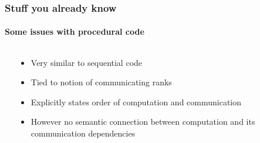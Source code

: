 \begin{frame}[fragile]
\frametitle{Stuff you already know}
\framesubtitle{Some issues with procedural code}

  \begin{columns}
    \begin{column}{0.4\textwidth}
      
    \end{column}
    \begin{column}{0.6\textwidth}
      \begin{itemize}
      \item Very similar to sequential code
      \item Tied to notion of communicating ranks
      \item Explicitly states order of computation and communication
      \item However no semantic connection between computation and its communication dependencies
      \end{itemize}
    \end{column}
  \end{columns}

\end{frame}

